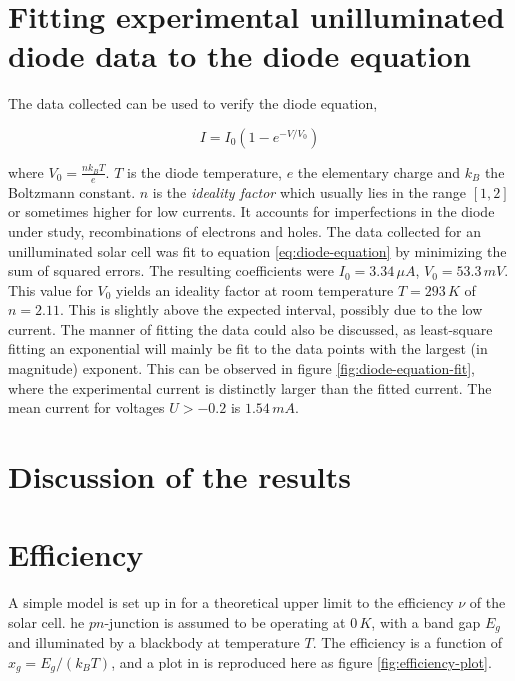 \documentclass[a4paper,twoside=false,abstract=false,numbers=noenddot,
titlepage=false,headings=small,parskip=half,version=last]{scrartcl}
\begin{document}
\section{Fitting experimental unilluminated diode data to the diode equation}
The data collected can be used to verify the diode equation,

\begin{equation}
    I = I_0 \left(1-e^{-V/V_0}\right)\label{eq:diode-equation}
\end{equation}

where $V_0 = \frac{nk_BT}{e}$.
$T$ is the diode temperature, $e$ the elementary charge and $k_B$ the Boltzmann constant.
$n$ is the \emph{ideality factor} which usually lies in the range $[1,2]$ or sometimes higher for low currents.
It accounts for imperfections in the diode under study, recombinations of electrons and holes.
The data collected for an unilluminated solar cell was fit to equation \eqref{eq:diode-equation} by minimizing the sum of squared errors.
The resulting coefficients were $I_0=3.34\,\mu A$, $V_0=53.3\, mV$.
This value for $V_0$ yields an ideality factor at room temperature $T=293\,K$ of $n = 2.11$.
This is slightly above the expected interval, possibly due to the low current.
The manner of fitting the data could also be discussed, as least-square fitting an exponential will mainly be fit to the data points with the largest (in magnitude) exponent.
This can be observed in figure \ref{fig:diode-equation-fit}, where the experimental current is distinctly larger than the fitted current.
The mean current for voltages $U>-0.2$ is $1.54\,mA$.
\section{Discussion of the results}


\section{Efficiency}
A simple model is set up in \cite{lab-instruction} for a theoretical upper limit to the efficiency $\nu$ of the solar cell.
he $pn$-junction is assumed to be operating at $0\,K$, with a band gap $E_g$ and illuminated by a blackbody at temperature $T$.
The efficiency is a function of $x_g=E_g/(k_BT)$, and a plot in \cite{lab-instruction} is reproduced here as figure \ref{fig:efficiency-plot}.
\end{document}
